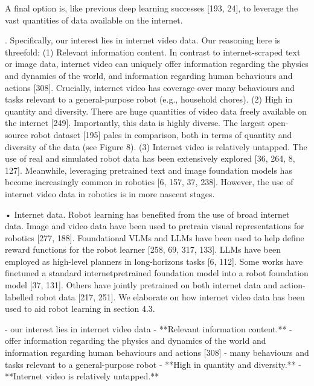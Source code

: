

	A final option is, like previous deep learning successes [193, 24], to leverage the vast quantities of data available on the internet.

	. Specifically, our interest lies in internet video data. Our reasoning here is threefold:
(1) Relevant information content. In contrast to internet-scraped text or image data, internet video can uniquely
offer information regarding the physics and dynamics of the world, and information regarding human
behaviours and actions [308]. Crucially, internet video has coverage over many behaviours and tasks
relevant to a general-purpose robot (e.g., household chores).
(2) High in quantity and diversity. There are huge quantities of video data freely available on the internet [249].
Importantly, this data is highly diverse. The largest open-source robot dataset [195] pales in comparison,
both in terms of quantity and diversity of the data (see Figure 8).
(3) Internet video is relatively untapped. The use of real and simulated robot data has been extensively explored
[36, 264, 8, 127]. Meanwhile, leveraging pretrained text and image foundation models has become increasingly common in robotics [6, 157, 37, 238]. However, the use of internet video data in robotics is in more
nascent stages.

• Internet data. Robot learning has benefited from the use of broad internet data. Image and video data have
been used to pretrain visual representations for robotics [277, 188]. Foundational VLMs and LLMs have been
used to help define reward functions for the robot learner [258, 69, 317, 133]. LLMs have been employed
as high-level planners in long-horizons tasks [6, 112]. Some works have finetuned a standard internetpretrained foundation model into a robot foundation model [37, 131]. Others have jointly pretrained on
both internet data and action-labelled robot data [217, 251]. We elaborate on how internet video data has
been used to aid robot learning in section 4.3.


- our interest lies in internet video data
    - **Relevant information content.**
        - offer information regarding the physics and dynamics of the world and information regarding human behaviours and actions [308]
        - many behaviours and tasks relevant to a general-purpose robot
    - **High in quantity and diversity.**
    - **Internet video is relatively untapped.**



